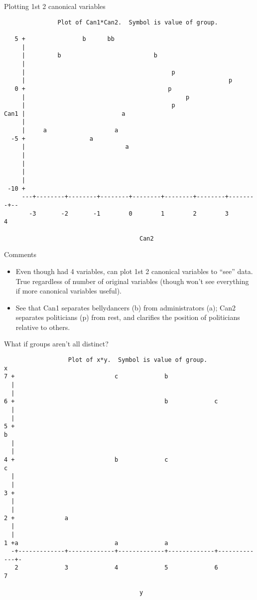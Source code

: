 \documentclass[pdf]{prosper}
\begin{document}
\begin{slide}{Plotting 1st 2 canonical variables}


{\scriptsize
\begin{verbatim}
               Plot of Can1*Can2.  Symbol is value of group.

   5 +                b      bb
     |
     |         b                          b
     |
     |                                         p
     |                                                         p
   0 +                                        p
     |                                             p
     |                                         p
Can1 |                           a
     |
     |     a                   a
  -5 +                  a
     |                            a
     |
     |
     |
     |
 -10 +
     ---+--------+--------+--------+--------+--------+--------+--------+--
       -3       -2       -1        0        1        2        3        4

                                      Can2

\end{verbatim}
}

\end{slide}

\begin{slide}{Comments}

  \begin{itemize}
  \item 
  Even though had 4 variables, can plot 1st 2 canonical variables to
  ``see'' data. True regardless of number of original variables (though won't see everything if more canonical variables useful).

\item See that Can1 separates bellydancers (b) from administrators (a); Can2 separates politicians (p) from rest, and clarifies the position of politicians relative to others.
  \end{itemize}
  
\end{slide}


\begin{slide}{What if groups aren't all distinct?}

{\scriptsize
\begin{verbatim}
                  Plot of x*y.  Symbol is value of group.
x
7 +                            c             b
  |
  |
6 +                                          b             c
  |
  |
5 +                                                                      b
  |
  |
4 +                            b             c                           c
  |
  |
3 +
  |
  |
2 +              a
  |
  |
1 +a                           a             a
  -+-------------+-------------+-------------+-------------+-------------+-
   2             3             4             5             6             7

                                      y

\end{verbatim}
}

  
\end{slide}
\end{document}
